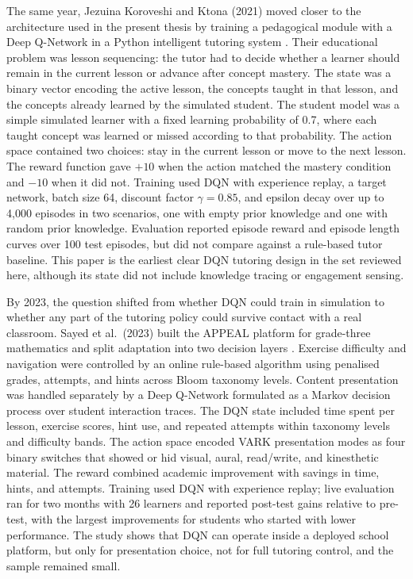The same year, Jezuina Koroveshi and Ktona (2021) moved closer to the architecture used in the present thesis by training a pedagogical module with a Deep Q-Network in a Python intelligent tutoring system \cite{jezuina_koroveshi_training_2021}. Their educational problem was lesson sequencing: the tutor had to decide whether a learner should remain in the current lesson or advance after concept mastery. The state was a binary vector encoding the active lesson, the concepts taught in that lesson, and the concepts already learned by the simulated student. The student model was a simple simulated learner with a fixed learning probability of 0.7, where each taught concept was learned or missed according to that probability. The action space contained two choices: stay in the current lesson or move to the next lesson. The reward function gave $+10$ when the action matched the mastery condition and $-10$ when it did not. Training used DQN with experience replay, a target network, batch size 64, discount factor $\gamma=0.85$, and epsilon decay over up to 4{,}000 episodes in two scenarios, one with empty prior knowledge and one with random prior knowledge. Evaluation reported episode reward and episode length curves over 100 test episodes, but did not compare against a rule-based tutor baseline. This paper is the earliest clear DQN tutoring design in the set reviewed here, although its state did not include knowledge tracing or engagement sensing.

By 2023, the question shifted from whether DQN could train in simulation to whether any part of the tutoring policy could survive contact with a real classroom. Sayed et al.\ (2023) built the APPEAL platform for grade-three mathematics and split adaptation into two decision layers \cite{sayed_ai-based_2023}. Exercise difficulty and navigation were controlled by an online rule-based algorithm using penalised grades, attempts, and hints across Bloom taxonomy levels. Content presentation was handled separately by a Deep Q-Network formulated as a Markov decision process over student interaction traces. The DQN state included time spent per lesson, exercise scores, hint use, and repeated attempts within taxonomy levels and difficulty bands. The action space encoded VARK presentation modes as four binary switches that showed or hid visual, aural, read/write, and kinesthetic material. The reward combined academic improvement with savings in time, hints, and attempts. Training used DQN with experience replay; live evaluation ran for two months with 26 learners and reported post-test gains relative to pre-test, with the largest improvements for students who started with lower performance. The study shows that DQN can operate inside a deployed school platform, but only for presentation choice, not for full tutoring control, and the sample remained small.

